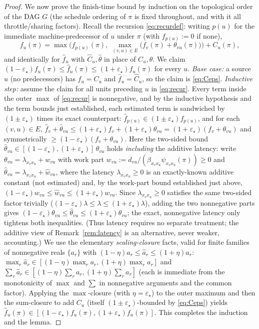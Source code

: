 \documentclass{amsart}
\theoremstyle{definition}
\begin{document}
\begin{proof}
We now prove the finish-time bound by induction on the topological order of the
DAG $G$ (the schedule ordering of $\pi$ is fixed throughout, and with it all
throttle/sharing factors). Recall the recursion \eqref{eq:recurdef}: writing
$p(u)$ for the immediate machine-predecessor of $u$ under $\pi$ (with
$f_{p(u)}:=0$ if none),
\begin{equation}\label{eq:recur}
f_u(\pi)=\max\Big(f_{p(u)}(\pi),\ \max_{(v,u)\in E}\big(f_v(\pi)+\theta_{vu}(\pi)\big)\Big)+C_u(\pi),
\end{equation}
and identically for $\widehat f_u$ with $\widehat C_u,\widehat\theta$ in place of
$C_u,\theta$. We claim $(1-\varepsilon_\star)f_u(\pi)\le\widehat f_u(\pi)\le
(1+\varepsilon_\star)f_u(\pi)$ for every $u$. \emph{Base case:} a source $u$ (no
predecessors) has $f_u=C_u$ and $\widehat f_u=\widehat C_u$, so the claim is
\eqref{eq:Ceps}. \emph{Inductive step:} assume the claim for all units preceding
$u$ in \eqref{eq:recur}. Every term inside the outer $\max$ of \eqref{eq:recur}
is nonnegative, and by the inductive hypothesis and the term bounds just
established, each estimated term is sandwiched by $(1\pm\varepsilon_\star)$ times
its exact counterpart:
$\widehat f_{p(u)}\in(1\pm\varepsilon_\star)f_{p(u)}$, and for each $(v,u)\in E$,
$\widehat f_v+\widehat\theta_{vu}\le(1+\varepsilon_\star)f_v+(1+\varepsilon_\star)\theta_{vu}
=(1+\varepsilon_\star)(f_v+\theta_{vu})$ and symmetrically
$\ge(1-\varepsilon_\star)(f_v+\theta_{vu})$.
Here the two-sided bound $\widehat\theta_{vu}\in[(1-\varepsilon_\star),
(1+\varepsilon_\star)]\,\theta_{vu}$ holds \emph{including} the additive
latency: write $\theta_{vu}=\lambda_{x_vx_u}+w_{vu}$ with work part
$w_{vu}:=d_{vu}/(\beta_{x_vx_u}\psi_{x_vx_u}(\pi))\ge0$ and
$\widehat\theta_{vu}=\lambda_{x_vx_u}+\widehat w_{vu}$, where the latency
$\lambda_{x_vx_u}\ge0$ is an exactly-known additive constant (not estimated)
and, by the work-part bound established just above,
$(1-\varepsilon_\star)w_{vu}\le\widehat w_{vu}\le(1+\varepsilon_\star)w_{vu}$.
Since $\lambda_{x_vx_u}\ge0$ satisfies the same two-sided factor trivially
($(1-\varepsilon_\star)\lambda\le\lambda\le(1+\varepsilon_\star)\lambda$),
adding the two nonnegative parts gives
$(1-\varepsilon_\star)\theta_{vu}\le\widehat\theta_{vu}\le
(1+\varepsilon_\star)\theta_{vu}$; the exact, nonnegative latency only tightens
both inequalities. (Thus latency requires no separate treatment; the additive
view of Remark~\ref{rem:latency} is an alternative, never weaker, accounting.)
We use the elementary \emph{scaling-closure} facts, valid for finite families of
nonnegative reals $\{a_r\}$ with $(1-\eta)a_r\le\hat a_r\le(1+\eta)a_r$:
$\max_r\hat a_r\in[(1-\eta)\max_r a_r,(1+\eta)\max_r a_r]$ and
$\sum_r\hat a_r\in[(1-\eta)\sum_r a_r,(1+\eta)\sum_r a_r]$ (each is immediate
from the monotonicity of $\max$ and $\sum$ in nonnegative arguments and the
common factor). Applying the $\max$-closure (with $\eta=\varepsilon_\star$) to
the outer maximum and then the sum-closure to add $C_u$ (itself
$(1\pm\varepsilon_\star)$-bounded by \eqref{eq:Ceps}) yields
$\widehat f_u(\pi)\in[(1-\varepsilon_\star)f_u(\pi),(1+\varepsilon_\star)f_u(\pi)]$.
This completes the induction and the lemma.
\end{proof}
\end{document}
